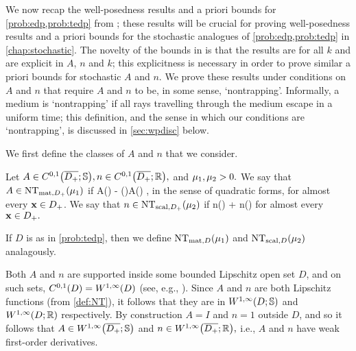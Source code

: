   We  now recap the well-posedness results and a priori bounds for \cref{prob:edp,prob:tedp} from \cite{GrPeSp:19}; these results will be crucial for proving well-posedness results and a priori bounds for the stochastic analogues of \cref{prob:edp,prob:tedp} in \cref{chap:stochastic}. The novelty of the bounds in \cite{GrPeSp:19} is that the results are for all $k$ and are explicit in $A$, $n$ and $k$; this explicitness is necessary in order to prove similar a priori bounds for stochastic $A$ and $n$. We prove these results under conditions on $A$ and $n$ that require $A$ and $n$ to be, in some sense, `nontrapping'. Informally, a medium is `nontrapping' if all rays travelling through the medium escape in a uniform time; this definition, and the sense in which our conditions are `nontrapping', is discussed in \cref{sec:wpdisc} below.

  We first define the classes of $A$ and $n$ that we consider.%

  
\label{def:NT}
Let $A \in \CzoDpclosRRdtd, n \in \CzoDpclosRR,$ and $\mu_{1}, \mu_{2} > 0.$ We say that $A \in \NTADp{\muo}$ if
\beqs
A(\bx) - \mleft(\bx \cdot \grad\mright)A(\bx) \geq \muo,
\eeqs
in the sense of quadratic forms, for almost every $\mathbf{x} \in D_{+}$. We say that $n \in \NTnDp{\mut}$ if
\beqs
n(\bx) + \bx \cdot \grad n(\bx) \geq \mut
\eeqs
for almost every $\mathbf{x} \in D_{+}.$

If $D$ is as in \cref{prob:tedp}, then we define $\NTAD{\muo}$ and $\NTnD{\mut}$ analagously.
\ede

Both $A$ and $n$ are supported inside some bounded Lipschitz open set $D$, and on such sets, $\CzoD = \WoiD$ (see, e.g., \cite[Section 4.2.3, Theorem 5]{EvGa:92}). Since $A$ and $n$ are both Lipschitz functions (from \cref{def:NT}), it follows that they are in $\WoiDRRdtd$ and $\WoiDRR$ respectively. By construction $A=I$ and $n=1$ outside $D$, and so it follows that $A \in \WoiDpclosRRdtd$ and $n \in \WoiDpclosRR,$ i.e., $A$ and $n$ have weak first-order derivatives.
\ere


